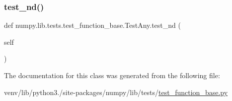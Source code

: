 \mbox{\label{classnumpy_1_1lib_1_1tests_1_1test__function__base_1_1TestAny_ad99d0573b410b7758f1ca050794e2a5a}} 
\subsubsection{\texorpdfstring{test\+\_\+nd()}{test\_nd()}}
{\footnotesize\ttfamily def numpy.\+lib.\+tests.\+test\+\_\+function\+\_\+base.\+Test\+Any.\+test\+\_\+nd (\begin{DoxyParamCaption}\item[{}]{self }\end{DoxyParamCaption})}



The documentation for this class was generated from the following file\+:\begin{DoxyCompactItemize}
\item 
venv/lib/python3./site-\/packages/numpy/lib/tests/\hyperlink{lib_2tests_2test__function__base_8py}{test\+\_\+function\+\_\+base.\+py}\end{DoxyCompactItemize}
